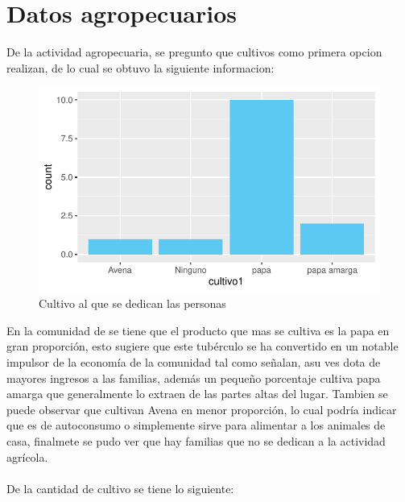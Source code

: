 \documentclass[12pt]{article}\usepackage[]{graphicx}\usepackage[]{xcolor}
\makeatletter
\def\maxwidth{ %
  \ifdim\Gin@nat@width>\linewidth
    \linewidth
  \else
    \Gin@nat@width
  \fi
}
\newenvironment{knitrout}{}{} %
\makeatother
\begin{document}
	\section{Datos agropecuarios}
	De la actividad agropecuaria, se pregunto que cultivos como primera opcion realizan, de lo cual se obtuvo la siguiente informacion:
	\begin{figure}[H]
	\centering
\begin{knitrout}
\color{fgcolor}
\includegraphics[width=\maxwidth]{figure/seven-1} 
\end{knitrout}
	\caption{Cultivo al que se dedican las personas}
	\end{figure}
	En la comunidad de \comunidad se tiene que el producto que mas se cultiva es la papa en gran proporción, esto sugiere que este tubérculo se ha convertido en un notable impulsor de la economía de la comunidad tal como señalan, asu ves dota de mayores ingresos a las familias, además un pequeño porcentaje cultiva papa amarga que generalmente lo extraen de las partes altas del lugar. Tambien se puede observar que cultivan Avena en menor proporción, lo cual podría indicar que es de autoconsumo o simplemente sirve para alimentar a los animales de casa, finalmete se pudo ver que hay familias que no se dedican a la actividad agrícola.\\
	\\
	De la cantidad de cultivo se tiene lo siguiente:
\end{document}

